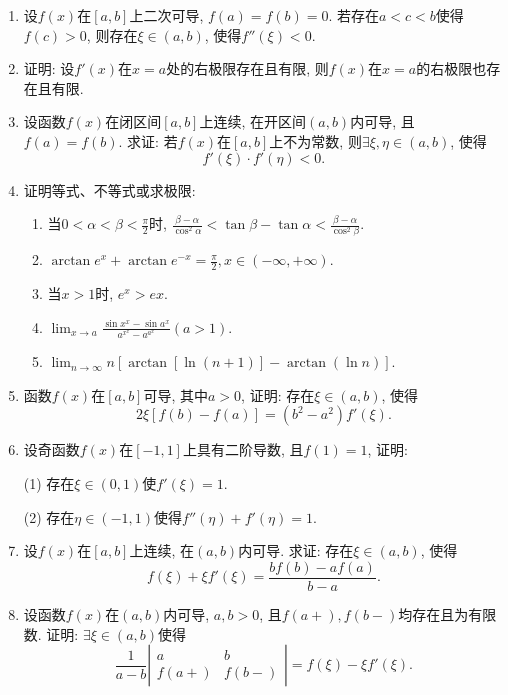 \documentclass[UTF8,11pt, a4paper, oneside, fontset=none]{ctexbook}
\begin{document}
\begin{enumerate}

\item 设$f(x)$在$[a, b]$上二次可导, $f(a) = f(b) =0$. 若存在$a < c < b$使得$f(c) >0$, 则存在$\xi \in (a, b)$, 使得$f''(\xi) <0$.

\item 证明: 设$f'(x)$在$x=a$处的右极限存在且有限, 则$f(x)$在$x=a$的右极限也存在且有限.

\item 设函数$f(x)$在闭区间$[a, b]$上连续, 在开区间$(a, b)$内可导, 且$f(a) = f(b)$. 求证: 若$f(x)$在$[a, b]$上不为常数, 则$\exists \xi, \eta \in (a, b)$, 使得
\[
f'(\xi) \cdot f'(\eta) <0.
\]

\item 证明等式、不等式或求极限:
\begin{enumerate}
\item 当$0 < \alpha < \beta < \frac{\pi}{2}$时, $\frac{\beta - \alpha}{\cos^2 \alpha} < \tan \beta - \tan \alpha < \frac{\beta - \alpha}{\cos^2 \beta}$.

\item $\arctan e^x + \arctan e^{-x} = \frac{\pi}{2}, x \in (-\infty, +\infty)$.

\item 当$x>1$时, $e^x > e x$.

\item $\lim_{x \to a} \frac{\sin x^x - \sin a^x}{a^{x^x} - a^{a^x}} (a > 1)$.

\item $\lim_{n \to \infty} n[\arctan[\ln(n+1)] - \arctan (\ln n)]$.

\end{enumerate}

\item 函数$f(x)$在$[a, b]$可导, 其中$a >0$, 证明: 存在$\xi \in (a, b)$, 使得
\[
2 \xi [f(b) - f(a)] = (b^2 - a^2) f'(\xi).
\]


\item 设奇函数$f(x)$在$[-1, 1]$上具有二阶导数, 且$f(1) =1$, 证明:

(1) 存在$\xi \in (0, 1)$使$f'(\xi) =1$.

(2) 存在$\eta \in (-1, 1)$使得$f''(\eta) + f'(\eta) =1$.


\item 设$f(x)$在$[a, b]$上连续, 在$(a, b)$内可导. 求证: 存在$\xi \in (a, b)$, 使得
\[
f(\xi) + \xi f'(\xi) = \frac{bf(b) - af(a)}{b-a}.
\]

\item 设函数$f(x)$在$(a, b)$内可导, $a, b >0$, 且$f(a+), f(b-)$均存在且为有限数. 证明: $\exists \xi \in (a, b)$使得
\[
\frac{1}{a - b}  \left| 
\begin{array}{cc}
a & b \\
f(a+) & f(b-) 
\end{array}
\right| = f(\xi) - \xi f'(\xi).
\]


\end{enumerate}
\end{document}

